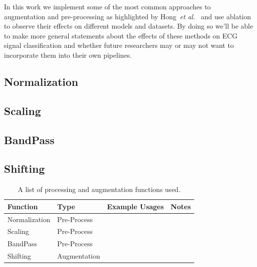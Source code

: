 \documentclass{article}
\begin{document}
In this work we implement some of the most common approaches to augmentation and pre-processing as highlighted by Hong~\textit{et al.}~\cite{hong2022practical} and use ablation to observe their effects on different models and datasets. By doing so we'll be able to make more general statements about the effects of these methods on ECG signal classification and whether future researchers may or may not want to incorporate them into their own pipelines. 

\subsection{Normalization}
\subsection{Scaling}
\subsection{BandPass}
\subsection{Shifting}

\begin{table}[tpb]
\centering
\begin{tabular}{|l|l|l|l|}
\hline
Function      & Type         & Example Usages & Notes \\ \hline
Normalization & Pre-Process  &                &       \\ \hline
Scaling       & Pre-Process  &                &       \\ \hline
BandPass      & Pre-Process  &                &       \\ \hline
Shifting      & Augmentation &                &       \\ \hline

\end{tabular}
\caption{A list of processing and augmentation functions used. }
\label{tab:processing_funcs}
\end{table}
\end{document}
